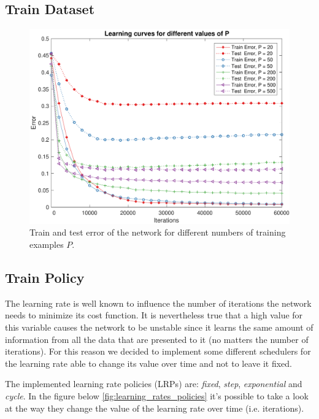 \subsection{Train Dataset}
\begin{figure}[t]
	\centering
	\includegraphics[width=\columnwidth]{figures/error_ps}
    \caption{Train and test error of the network for different numbers of training examples $P$.}
	\label{fig:ps}
\end{figure}


\subsection{Train Policy}
The learning rate is well known to influence the number of iterations the network needs to minimize
its cost function. It is nevertheless true that a high value for this variable causes the network to
be unstable since it learns the same amount of information from all the data that are presented to it (no matters the number of iterations).
For this reason we decided to implement some different schedulers for the learning rate able to change its
value over time and not to leave it fixed.

The implemented learning rate policies (LRPs) are: \textit{fixed}, \textit{step}, \textit{exponential} and \textit{cycle}.
In the figure below \cref{fig:learning_rates_policies} it's possible to take a look at the way they change the value of the learning rate over time (i.e. iterations).

